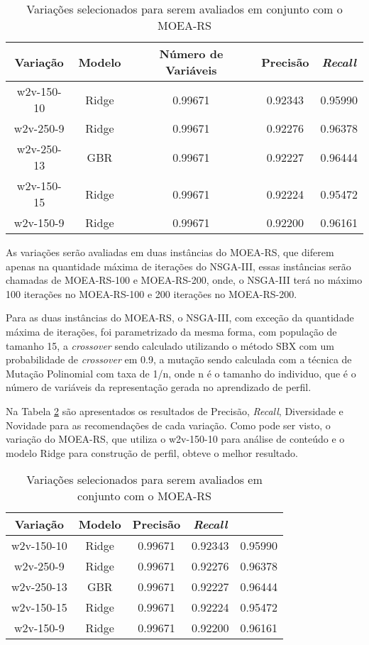 \begin{table}[H]
\centering
\begin{tabular}{|c| c c  c  c | }
\hline
Variação &  Modelo & Número de Variáveis & Precisão & \textit{Recall} \\ 
\hline
w2v-150-10 & Ridge & 0.99671 & 0.92343 & 0.95990  \\
\hline
w2v-250-9 & Ridge & 0.99671 & 0.92276 & 0.96378  \\
\hline
w2v-250-13 & GBR & 0.99671 & 0.92227 & 0.96444  \\
\hline
w2v-150-15 & Ridge & 0.99671 & 0.92224 & 0.95472  \\
\hline
w2v-150-9 & Ridge & 0.99671 & 0.92200 & 0.96161  \\
\hline
\end{tabular}
\caption{Variações selecionados para serem avaliados em conjunto com o MOEA-RS}
\label{tab:selected_variations}
\end{table}

As variações serão avaliadas em duas instâncias do MOEA-RS, que diferem apenas na quantidade máxima de iterações do NSGA-III, essas instâncias serão chamadas de MOEA-RS-100 e MOEA-RS-200, onde, o NSGA-III terá no máximo 100 iterações no MOEA-RS-100  e 200 iterações no MOEA-RS-200.

Para as duas instâncias do MOEA-RS, o NSGA-III, com exceção da quantidade máxima de iterações, foi parametrizado da mesma forma, com população de tamanho 15, a \textit{crossover} sendo calculado utilizando o método SBX \cite{deb2007sbx} com um probabilidade de \textit{crossover} em 0.9, a mutação sendo calculada com a técnica de Mutação Polinomial \cite{deb2014analysing} com taxa de 1/n, onde n é o tamanho do individuo, que é o número de variáveis da representação gerada no aprendizado de perfil.

Na Tabela \ref{tab:selected_variations_results} são apresentados os resultados de Precisão, \textit{Recall}, Diversidade e Novidade para as recomendações de cada variação. Como pode ser visto,  o variação do MOEA-RS, que utiliza o w2v-150-10 para análise de conteúdo e o modelo Ridge para construção de perfil, obteve o melhor resultado.
\begin{table}[H]
\centering
\begin{tabular}{|c| c c  c c | }
\hline
Variação &  Modelo & Precisão & \textit{Recall} \\ 
\hline
w2v-150-10 & Ridge & 0.99671 & 0.92343 & 0.95990  \\
\hline
w2v-250-9 & Ridge & 0.99671 & 0.92276 & 0.96378  \\
\hline
w2v-250-13 & GBR & 0.99671 & 0.92227 & 0.96444  \\
\hline
w2v-150-15 & Ridge & 0.99671 & 0.92224 & 0.95472  \\
\hline
w2v-150-9 & Ridge & 0.99671 & 0.92200 & 0.96161  \\
\hline
\end{tabular}
\caption{Variações selecionados para serem avaliados em conjunto com o MOEA-RS}
\label{tab:selected_variations_results}
\end{table}

